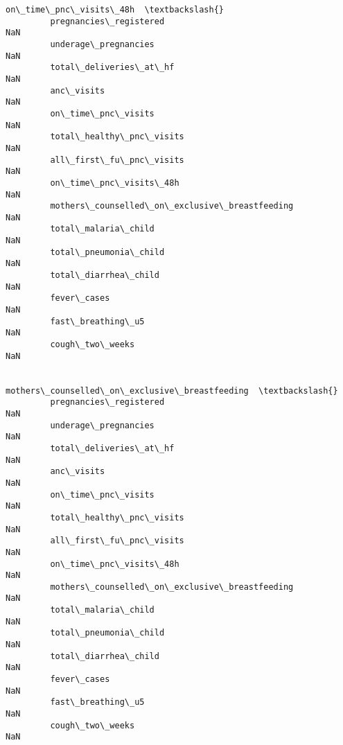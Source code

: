 \documentclass[11pt]{article}
\begin{document}
\begin{Verbatim}[commandchars=\\\{\}]
                                                        on\_time\_pnc\_visits\_48h  \textbackslash{}
         pregnancies\_registered                                            NaN   
         underage\_pregnancies                                              NaN   
         total\_deliveries\_at\_hf                                            NaN   
         anc\_visits                                                        NaN   
         on\_time\_pnc\_visits                                                NaN   
         total\_healthy\_pnc\_visits                                          NaN   
         all\_first\_fu\_pnc\_visits                                           NaN   
         on\_time\_pnc\_visits\_48h                                            NaN   
         mothers\_counselled\_on\_exclusive\_breastfeeding                     NaN   
         total\_malaria\_child                                               NaN   
         total\_pneumonia\_child                                             NaN   
         total\_diarrhea\_child                                              NaN   
         fever\_cases                                                       NaN   
         fast\_breathing\_u5                                                 NaN   
         cough\_two\_weeks                                                   NaN   
         
                                                        mothers\_counselled\_on\_exclusive\_breastfeeding  \textbackslash{}
         pregnancies\_registered                                                                   NaN   
         underage\_pregnancies                                                                     NaN   
         total\_deliveries\_at\_hf                                                                   NaN   
         anc\_visits                                                                               NaN   
         on\_time\_pnc\_visits                                                                       NaN   
         total\_healthy\_pnc\_visits                                                                 NaN   
         all\_first\_fu\_pnc\_visits                                                                  NaN   
         on\_time\_pnc\_visits\_48h                                                                   NaN   
         mothers\_counselled\_on\_exclusive\_breastfeeding                                            NaN   
         total\_malaria\_child                                                                      NaN   
         total\_pneumonia\_child                                                                    NaN   
         total\_diarrhea\_child                                                                     NaN   
         fever\_cases                                                                              NaN   
         fast\_breathing\_u5                                                                        NaN   
         cough\_two\_weeks                                                                          NaN   
         

\end{Verbatim}
\end{document}
